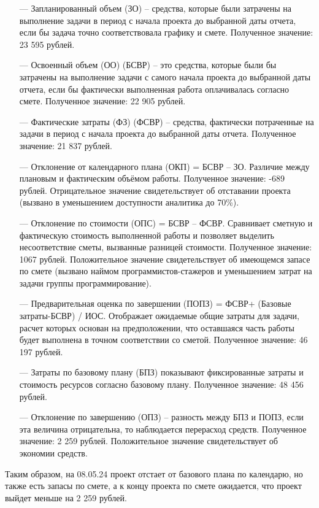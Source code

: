 \begin{itemize}
    \item[---] Запланированный объем (ЗО) – средства, которые были затрачены на
выполнение задачи в период с начала проекта до выбранной даты
отчета, если бы задача точно соответствовала графику и смете. Полученное значение: 23 595 рублей.
    \item[---] Освоенный объем (ОО) (БСВР) – это средства, которые были бы
затрачены на выполнение задачи с самого начала проекта до выбранной
даты отчета, если бы фактически выполненная работа оплачивалась
согласно смете. Полученное значение: 22 905 рублей.
    \item[---] Фактические затраты (ФЗ) (ФСВР) – средства, фактически
потраченные на задачи в период с начала проекта до выбранной даты
отчета. Полученное значение: 21 837 рублей.
    \item[---] Отклонение от календарного плана (ОКП) = БСВР – ЗО. Различие
между плановым и фактическим объёмом работы. Полученное значение: -689 рублей. Отрицательное значение свидетельствует об отставании проекта
(вызвано в уменьшением доступности аналитика до 70\%).
    \item[---] Отклонение по стоимости (ОПС) = БСВР – ФСВР. Сравнивает
сметную и фактическую стоимость выполненной работы и позволяет
выделить несоответствие сметы, вызванные разницей стоимости. Полученное значение: 1067 рублей. Положительное значение свидетельствует об имеющемся запасе
по смете (вызвано наймом программистов-стажеров и уменьшением затрат на задачи группы программирование).
    \item[---] Предварительная оценка по завершении (ПОПЗ) = ФСВР+ (Базовые
затраты-БСВР) / ИОС. Отображает ожидаемые общие затраты для
задачи, расчет которых основан на предположении, что оставшаяся
часть работы будет выполнена в точном соответствии со сметой. Полученное значение: 46 197 рублей.
    \item[---] Затраты по базовому плану (БПЗ) показывают фиксированные
затраты и стоимость ресурсов согласно базовому плану. Полученное значение: 48 456 рублей.
    \item[---] Отклонение по завершению (ОПЗ) – разность между БПЗ и ПОПЗ,
если эта величина отрицательна, то наблюдается перерасход средств. Полученное значение: 2 259 рублей. Положительное значение свидетельствует об экономии средств.
\end{itemize}

Таким образом, на 08.05.24 проект отстает от базового плана по календарю, но
также есть запасы по смете, а к концу проекта по смете ожидается, что проект
выйдет меньше на 2 259 рублей.

